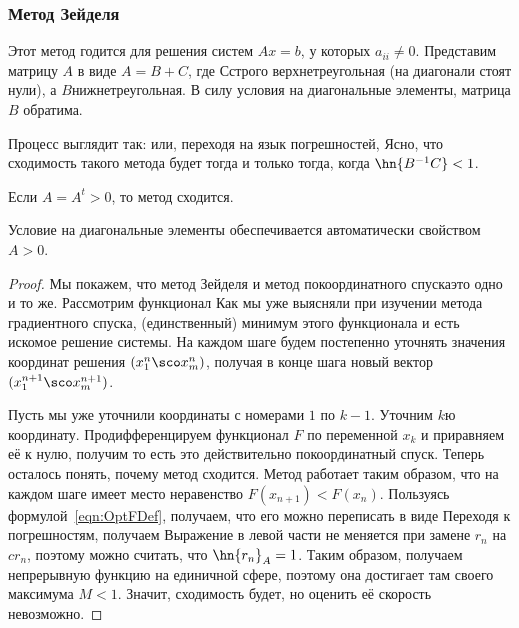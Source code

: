 \documentclass[a4paper]{article}
\begin{document}
\subsubsection{Метод Зейделя}

Этот метод годится для решения систем $Ax = b$, у которых $a_{ii} \ne 0$.
Представим матрицу $A$ в виде $A = B + C$, где $С$\т строго верхнетреугольная (на диагонали стоят нули),
а $B$\т нижнетреугольная. В силу условия на диагональные элементы, матрица $B$ обратима.

Процесс выглядит так:
или, переходя на язык погрешностей,
Ясно, что сходимость такого метода будет тогда и только тогда, когда $\hn{B^{-1}C} < 1$.

\begin{theorem}
Если $A = A^t > 0$, то метод сходится.
\end{theorem}

\begin{note}
Условие на диагональные элементы обеспечивается автоматически свойством $A > 0$.
\end{note}

\begin{proof}
Мы покажем, что метод Зейделя и метод покоординатного спуска\т это одно и то же.
Рассмотрим функционал
Как мы уже выясняли при изучении метода градиентного спуска, (единственный) минимум этого
функционала и есть искомое решение системы. На каждом шаге будем
постепенно уточнять значения координат решения $(x_1^n\sco x_m^n)$, получая в конце шага
новый вектор $(x_1^{n+1}\sco x_m^{n+1})$.

Пусть мы уже уточнили координаты с номерами $1$ по $k-1$. Уточним $k$\д ю координату.
Продифференцируем функционал $F$ по переменной $x_k$ и приравняем её к нулю,
получим
то есть это действительно покоординатный спуск.
Теперь осталось понять, почему метод сходится.
Метод работает таким образом, что на каждом шаге имеет место
неравенство $F(x_{n+1}) < F(x_n)$. Пользуясь формулой~\eqref{eqn:OptFDef},
получаем, что его можно переписать в виде
Переходя к погрешностям, получаем
Выражение в левой части не меняется при замене $r_n$ на $c r_n$, поэтому можно считать, что
$\hn{r_n}_A = 1$. Таким образом, получаем непрерывную функцию на единичной сфере,
поэтому она достигает там своего максимума $M < 1$. Значит, сходимость будет,
но оценить её скорость невозможно.
\end{proof}
\end{document}

